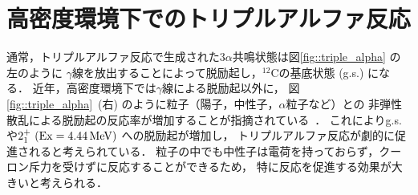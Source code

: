 \documentclass[../master]{subfiles}
\begin{document}
\section{高密度環境下でのトリプルアルファ反応}
\label{seq::triplealphareaction}
通常，トリプルアルファ反応で生成された$3\alpha$共鳴状態は図\ref{fig::triple_alpha} の左のように
$\gamma$線を放出することによって脱励起し，${}^{12}\mathrm{C}$の基底状態 (g.s.) になる．
近年，高密度環境下では$\gamma$線による脱励起以外に，
図\ref{fig::triple_alpha}~(右) のように粒子（陽子，中性子，$\alpha$粒子など）との
非弾性散乱による脱励起の反応率が増加することが指摘されている~\cite{hotdensemedium}．
これによりg.s.や$2_{1}^{+}\ ({\rm Ex} = \SI{4.44}{\mega\electronvolt})$ への脱励起が増加し，
トリプルアルファ反応が劇的に促進されると考えられている．
粒子の中でも中性子は電荷を持っておらず，クーロン斥力を受けずに反応することができるため，
特に反応を促進する効果が大きいと考えられる．


\end{document}
